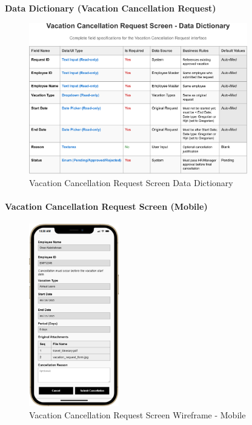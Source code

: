 \documentclass[12pt,a4paper]{article}
\begin{document}
\noindent\textbf{Data Dictionary (Vacation Cancellation Request)}
\begin{figure}[H]
\centering
\includegraphics[width=0.85\textwidth]{Data-Dictionary/Screen-Data-Dictionaries/Vacation-Cancellation-Request-Screen-Data-Dictionary/Vacation-Cancellation-Request-Screen-Data-Dictionary-1.png}
\caption{Vacation Cancellation Request Screen Data Dictionary}
\label{fig:vacation-cancellation-data-dict-inline}
\end{figure}

\paragraph{Vacation Cancellation Request Screen (Mobile)}
\begin{figure}[H]
\centering
\includegraphics[width=0.35\textwidth]{Wireframes/Vacation-Cancellation-Request/Vacation-Cancellation-Request-Mobile.png}
\caption{Vacation Cancellation Request Screen Wireframe - Mobile}
\label{fig:wireframe-vacation-cancellation-mobile}
\end{figure}
\end{document}

